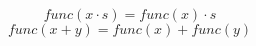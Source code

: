 \documentclass[preview]{standalone}
\begin{document}
$$func(x\cdot s) = func(x)\cdot s$$
$$func(x + y) = func(x) + func(y)$$
\end{document}
